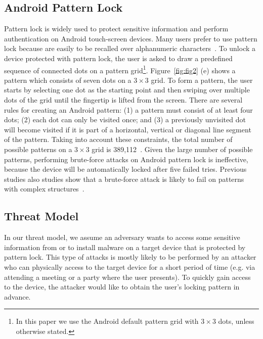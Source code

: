     \subsection{Android Pattern Lock}
    \label{section: android_pattern_lock}
        Pattern lock is widely used to protect sensitive information and perform authentication on
        Android touch-screen devices. Many users prefer to use pattern lock because 
        are easily to be recalled over alphanumeric characters~\cite{standing1970perception,Weiss2008PassShapes}.
        To unlock a device protected with pattern lock, the user is asked to draw a predefined sequence of connected dots on a pattern grid\footnote{In this paper we use the Android default pattern grid with $3 \times 3$ dots, unless otherwise stated.}.
        Figure~\ref{fig:fig2} (e) shows a pattern which consists of seven dots on a $3 \times 3$ grid.
        To form a
        pattern, the user starts by selecting one dot as the
        starting point and then swiping over multiple dots of the grid until the fingertip is lifted from the screen.
        There are several rules for creating an Android pattern: (1) a pattern must consist
        of at least four dots; (2) each dot can only be visited once; and (3) a previously unvisited dot will
        become visited if it is part of a horizontal, vertical or diagonal
        line segment of the pattern. Taking into account these constraints, the total number of possible patterns
        on a $3\times3$ grid is 389,112~\cite{uellenbeck2013quantifying}.
        Given the large number of possible patterns, performing brute-force attacks on
        Android pattern lock is ineffective, because the device will be
        automatically locked after five failed tries.
        Previous studies also studies show that a brute-force attack is likely to fail on  patterns with complex
        structures~\cite{Kelley2012Guess,Mazurek2013Measuring}.

    \subsection{Threat Model}
    \label{sec:scenarios}
        In our threat model, we assume an adversary wants to access some sensitive information from or to install malware on a
target device that is protected by pattern lock. This type of attacks is mostly likely to be performed by an attacker
who can physically access to the target device for a short period of time (e.g. via  attending a meeting or a party where
the user presents). To quickly gain access to the device, the attacker would like to obtain
the user's locking pattern in advance.

